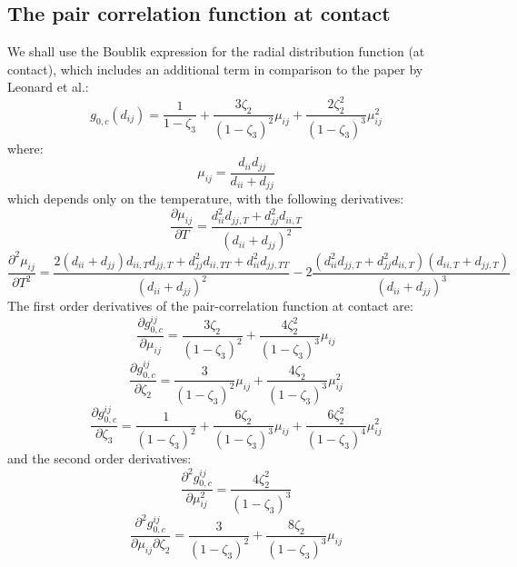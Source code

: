 \documentclass[english]{../thermomemo/thermomemo}
\newcommand{\z}{\zeta}
\begin{document}
\subsection{The pair correlation function at contact}
We shall use the Boublik expression for the radial distribution function (at contact), which includes an additional term in comparison to the paper by Leonard et al.:
\begin{equation}
g_{0,c}(d_{ij})=\frac{1}{1-\z_3}+\frac{3\z_2}{(1-\z_3)^2}\mu_{ij}+\frac{2\z_2^2}{(1-\z_3)^3}\mu_{ij}^2
\end{equation}
where:
\begin{equation}
\mu_{ij}=\frac{d_{ii}d_{jj}}{d_{ii}+d_{jj}}
\end{equation}
which depends only on the temperature, with the following derivatives:
\begin{equation}
\frac{\partial \mu_{ij}}{\partial T}=\frac{d_{ii}^2 d_{jj,T}+d_{jj}^2d_{ii,T}}{\left(d_{ii}+d_{jj}\right)^2}
\end{equation}
\begin{equation}
\frac{\partial^2 \mu_{ij}}{\partial T^2}=\frac{2(d_{ii}+d_{jj})d_{ii,T}d_{jj,T}+d_{jj}^2d_{ii,TT}+d_{ii}^2d_{jj,TT}}{\left(d_{ii}+d_{jj}\right)^2}-2\frac{\left(d_{ii}^2 d_{jj,T}+d_{jj}^2d_{ii,T}\right)(d_{ii,T}+d_{jj,T})}{\left(d_{ii}+d_{jj}\right)^3}
\end{equation}
The first order derivatives of the pair-correlation function at contact are:
\begin{equation}
\frac{\partial g_{0,c}^{ij}}{\partial \mu_{ij}}=\frac{3\z_2}{(1-\z_3)^2}+\frac{4\z_2^2}{(1-\z_3)^3}\mu_{ij}
\end{equation}
\begin{equation}
\frac{\partial g_{0,c}^{ij}}{\partial \z_2}=\frac{3}{(1-\z_3)^2}\mu_{ij}+\frac{4\z_2}{(1-\z_3)^3}\mu_{ij}^2
\end{equation}
\begin{equation}
\frac{\partial g_{0,c}^{ij}}{\partial \z_3}=\frac{1}{(1-\z_3)^2}+\frac{6\z_2}{(1-\z_3)^3}\mu_{ij}+\frac{6\z_2^2}{(1-\z_3)^4}\mu_{ij}^2
\end{equation}
and the second order derivatives:
\begin{equation}
\frac{\partial^2 g_{0,c}^{ij}}{\partial \mu_{ij}^2}=\frac{4\z_2^2}{(1-\z_3)^3}
\end{equation}
\begin{equation}
\frac{\partial^2 g_{0,c}^{ij}}{\partial \mu_{ij}\partial \z_2}=\frac{3}{(1-\z_3)^2}+\frac{8\z_2}{(1-\z_3)^3}\mu_{ij}
\end{equation}
\end{document}

